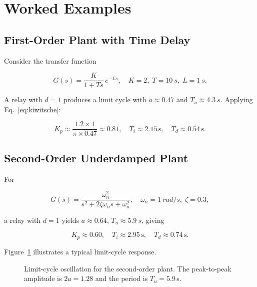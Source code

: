 \documentclass[12pt,a4paper]{article}
\begin{document}
\section{Worked Examples}
\label{sec:examples}

\subsection{First-Order Plant with Time Delay}

Consider the transfer function

\begin{equation}
  G(s) = \frac{K}{1 + Ts}\,e^{-Ls},
  \quad K=2,\; T=\SI{10}{s},\; L=\SI{1}{s}.
\end{equation}

A relay with $d=1$ produces a limit cycle with $a \approx 0.47$ and
$T_u \approx \SI{4.3}{s}$.  Applying Eq.~\eqref{eq:kiwitsche}:

\begin{equation}
  K_p \approx \frac{1.2 \times 1}{\pi \times 0.47} \approx 0.81, \quad
  T_i \approx 2.15\,\text{s}, \quad
  T_d \approx 0.54\,\text{s}.
\end{equation}

\subsection{Second-Order Underdamped Plant}

For

\begin{equation}
  G(s) = \frac{\omega_n^2}{s^2 + 2\zeta\omega_n s + \omega_n^2},
  \quad \omega_n = \SI{1}{rad/s},\; \zeta = 0.3,
\end{equation}

a relay with $d=1$ yields $a \approx 0.64$, $T_u \approx \SI{5.9}{s}$, giving

\begin{equation}
  K_p \approx 0.60, \quad T_i \approx 2.95\,\text{s}, \quad T_d \approx 0.74\,\text{s}.
\end{equation}

Figure~\ref{fig:limitcycle} illustrates a typical limit-cycle response.

\begin{figure}[H]
\centering
{}
\caption{Limit-cycle oscillation for the second-order plant. The peak-to-peak amplitude
is $2a = 1.28$ and the period is $T_u = 5.9$\,s.}
\label{fig:limitcycle}
\end{figure}
\end{document}
